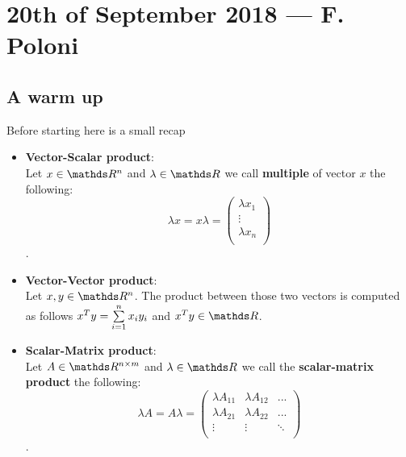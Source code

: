 \documentclass[computationalMathematics.tex]{subfiles}
\begin{document}
\section{20th of September 2018 --- F. Poloni}

\subsection{A warm up}
Before starting here is a small recap
\begin{itemize}
    \item \textbf{Vector-Scalar product}:\\
      Let $x \in \R^n$ and $\lambda \in \R$ we call \textbf{multiple} of vector $x$ the following:\\ $$\lambda x = x \lambda = \begin{pmatrix}\lambda x_1\\
        \vdots\\
        \lambda x_n\\
      \end{pmatrix}$$.
    
    \item \textbf{Vector-Vector product}:\\
     Let $x, y \in \R^n$. The product between those two vectors is computed as follows ${x}^{T} y = \sum\limits_{i=1}^n x_i y_i$ and $\tr{x}y \in \R$.
     
     \item \textbf{Scalar-Matrix product}:\\
      Let $A \in \R^{n\times m}$ and $\lambda \in \R$ we call the \textbf{scalar-matrix product} the following:\\ $$\lambda A = A \lambda = 
      \begin{pmatrix}
        \lambda A_{11}  & \lambda A_{12} & ...\\
        \lambda A_{21}  & \lambda A_{22} & ... \\
        \vdots  &\vdots & \ddots \\
      \end{pmatrix}$$.
     

\end{itemize}
\end{document}
